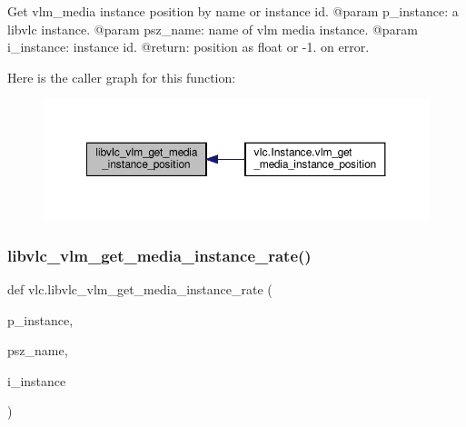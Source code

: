 \begin{DoxyVerb}Get vlm_media instance position by name or instance id.
@param p_instance: a libvlc instance.
@param psz_name: name of vlm media instance.
@param i_instance: instance id.
@return: position as float or -1. on error.
\end{DoxyVerb}
 Here is the caller graph for this function\+:
\nopagebreak
\begin{figure}[H]
\begin{center}
\leavevmode
\includegraphics[width=350pt]{namespacevlc_ad88fbcae963bb382bafa5f582c073ed9_icgraph}
\end{center}
\end{figure}
\mbox{\label{namespacevlc_a27709abc252d4ddc97dc2ea272a85acf}} 
\subsubsection{\texorpdfstring{libvlc\+\_\+vlm\+\_\+get\+\_\+media\+\_\+instance\+\_\+rate()}{libvlc\_vlm\_get\_media\_instance\_rate()}}
{\footnotesize\ttfamily def vlc.\+libvlc\+\_\+vlm\+\_\+get\+\_\+media\+\_\+instance\+\_\+rate (\begin{DoxyParamCaption}\item[{}]{p\+\_\+instance,  }\item[{}]{psz\+\_\+name,  }\item[{}]{i\+\_\+instance }\end{DoxyParamCaption})}

